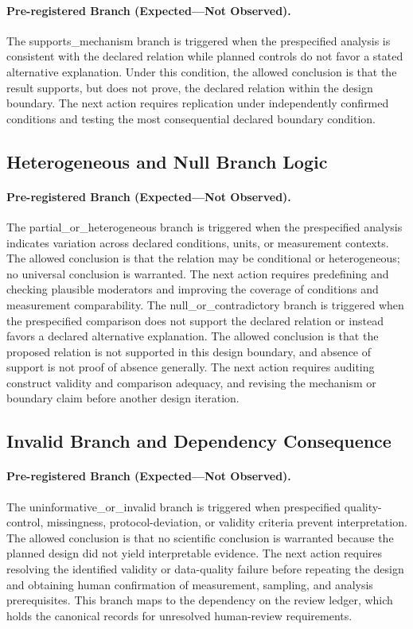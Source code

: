 \documentclass[conference]{IEEEtran}
\begin{document}
\paragraph{Pre-registered Branch (Expected---Not Observed).} The supports\_mechanism branch is triggered when the prespecified analysis is consistent with the declared relation while planned controls do not favor a stated alternative explanation. Under this condition, the allowed conclusion is that the result supports, but does not prove, the declared relation within the design boundary. The next action requires replication under independently confirmed conditions and testing the most consequential declared boundary condition.

\subsection{Heterogeneous and Null Branch Logic}
\paragraph{Pre-registered Branch (Expected---Not Observed).} The partial\_or\_heterogeneous branch is triggered when the prespecified analysis indicates variation across declared conditions, units, or measurement contexts. The allowed conclusion is that the relation may be conditional or heterogeneous; no universal conclusion is warranted. The next action requires predefining and checking plausible moderators and improving the coverage of conditions and measurement comparability. The null\_or\_contradictory branch is triggered when the prespecified comparison does not support the declared relation or instead favors a declared alternative explanation. The allowed conclusion is that the proposed relation is not supported in this design boundary, and absence of support is not proof of absence generally. The next action requires auditing construct validity and comparison adequacy, and revising the mechanism or boundary claim before another design iteration.

\subsection{Invalid Branch and Dependency Consequence}
\paragraph{Pre-registered Branch (Expected---Not Observed).} The uninformative\_or\_invalid branch is triggered when prespecified quality-control, missingness, protocol-deviation, or validity criteria prevent interpretation. The allowed conclusion is that no scientific conclusion is warranted because the planned design did not yield interpretable evidence. The next action requires resolving the identified validity or data-quality failure before repeating the design and obtaining human confirmation of measurement, sampling, and analysis prerequisites. This branch maps to the dependency on the review ledger, which holds the canonical records for unresolved human-review requirements.
\end{document}
